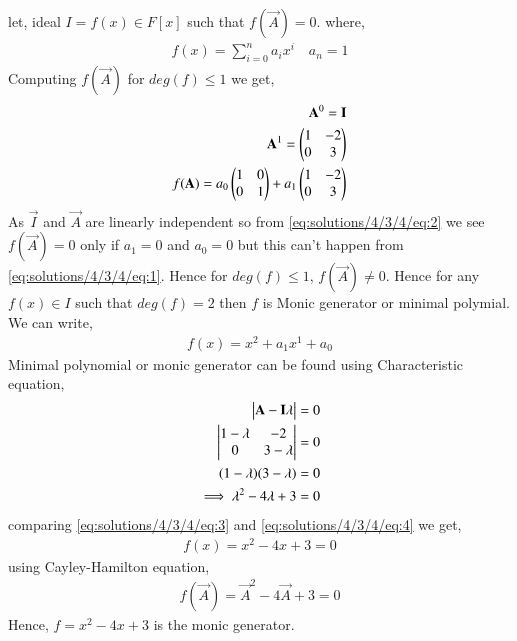 let, ideal $I = f(x) \in F[x]$ such that $f(\vec{A}) = 0$. where,
\begin{align}
f(x)=\sum_{i=0}^n a_ix^i \quad a_n=1  \label{eq:solutions/4/3/4/eq:1}
\end{align}
Computing $f(\vec{A})$ for $deg(f)\leq1$ we get,
\begin{align}
\mathbf{A}^0 = \mathbf{I}\\
\mathbf{A}^1 = \begin{pmatrix}1&-2\\0&3\end{pmatrix}\\
f(\mathbf{A}) = a_0\begin{pmatrix}1&0\\0&1\end{pmatrix}+a_1\begin{pmatrix}1&-2\\0&3\end{pmatrix} \label{eq:solutions/4/3/4/eq:2}
\end{align}
As $\vec{I}$ and $\vec{A}$ are linearly independent so from \eqref{eq:solutions/4/3/4/eq:2} we see  $f(\vec{A}) = 0$ only if $a_1=0$ and $a_0=0$ but this can't happen from \eqref{eq:solutions/4/3/4/eq:1}. Hence for $deg(f)\leq1$, $f(\vec{A})\neq0$. Hence for any $f(x) \in I$ such that $deg(f)=2$ then $f$ is Monic generator or minimal polymial. We can write,
\begin{align}
f(x) = x^2+a_1x^1+a_0 \label{eq:solutions/4/3/4/eq:3}
\end{align}
Minimal polynomial or monic generator can be found using Characteristic equation,
\begin{align}
\begin{vmatrix}\mathbf{A}-\mathbf{I}\lambda\end{vmatrix} =0\\
\begin{vmatrix}1-\lambda&-2\\0&3-\lambda\end{vmatrix} =0\\
(1-\lambda)(3-\lambda)=0\\
\implies \lambda^2-4\lambda+3=0 \label{eq:solutions/4/3/4/eq:4}
\end{align}
comparing \eqref{eq:solutions/4/3/4/eq:3} and \eqref{eq:solutions/4/3/4/eq:4} we get,
\begin{align}
f(x) = x^2 -4x+3 = 0
\end{align}
using Cayley-Hamilton equation,
\begin{align}
f(\vec{A}) = \vec{A}^2-4\vec{A}+3 = 0
\end{align}
Hence, $f=x^2 -4x+3$ is the monic generator.
